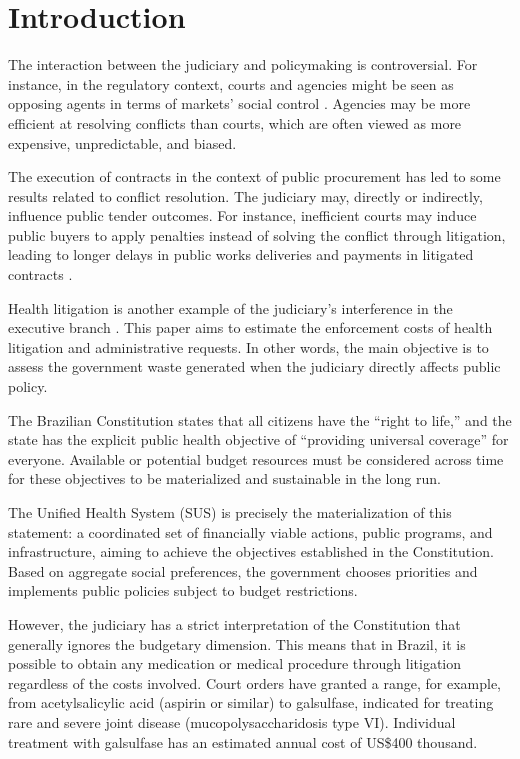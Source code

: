 \section{Introduction}
The interaction between the judiciary and policymaking is controversial. For instance, in the regulatory context, courts and agencies might be seen as opposing agents in terms of markets’ social control \citep{glaeser2003rise}. Agencies may be more efficient at resolving conflicts than courts, which are often viewed as more expensive, unpredictable, and biased.

The execution of contracts in the context of public procurement has led to some results related to conflict resolution. The judiciary may, directly or indirectly, influence public tender outcomes. For instance, inefficient courts may induce public buyers to apply penalties instead of solving the conflict through litigation, leading to longer delays in public works deliveries and payments in litigated contracts \citep{coviello2017court}.

Health litigation is another example of the judiciary’s interference in the executive branch \citep{wang2015right}. This paper aims to estimate the enforcement costs of health litigation and administrative requests. In other words, the main objective is to assess the government waste generated when the judiciary directly affects public policy.

The Brazilian Constitution states that all citizens have the “right to life,” and the state has the explicit public health objective of “providing universal coverage” for everyone. Available or potential budget resources must be considered across time for these objectives to be materialized and sustainable in the long run.

The Unified Health System (SUS) is precisely the materialization of this statement: a coordinated set of financially viable actions, public programs, and infrastructure, aiming to achieve the objectives established in the Constitution. Based on aggregate social preferences, the government chooses priorities and implements public policies subject to budget restrictions.

However, the judiciary has a strict interpretation of the Constitution that generally ignores the budgetary dimension. This means that in Brazil, it is possible to obtain any medication or medical procedure through litigation regardless of the costs involved. Court orders have granted a range, for example, from acetylsalicylic acid (aspirin or similar) to galsulfase, indicated for treating rare and severe joint disease (mucopolysaccharidosis type VI). Individual treatment with galsulfase has an estimated annual cost of US\$400 thousand.

